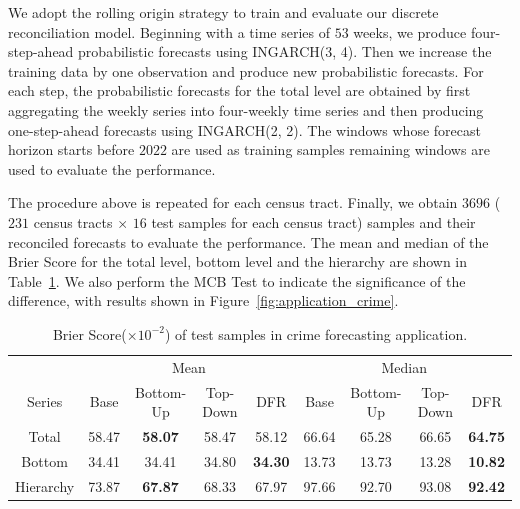 \documentclass[a4paper,review,12pt,authoryear]{elsarticle}
\begin{document}
     We adopt the rolling origin strategy to train and evaluate our discrete reconciliation model. 
     Beginning with a time series of $53$ weeks, we produce four-step-ahead probabilistic forecasts using INGARCH(3, 4). 
     Then we increase the training data by one observation and produce new probabilistic forecasts. 
     For each step, the probabilistic forecasts for the total level are obtained by first aggregating the weekly series into four-weekly time series and then producing one-step-ahead forecasts using INGARCH(2, 2).
     The windows whose forecast horizon starts before $2022$ are used as training samples remaining windows are used to evaluate the performance.
     
     The procedure above is repeated for each census tract. 
     Finally, we obtain $3696$ ($231$ census tracts $\times$ $16$ test samples for each census tract) samples and their reconciled forecasts to evaluate the performance. 
     The mean and median of the Brier Score for the total level, bottom level and the hierarchy are shown in Table~\ref{tab:crime_bs}. 
     We also perform the MCB Test to indicate the significance of the difference, with results shown in Figure~\ref{fig:application_crime}.
     
     
     \begin{table}[h]
       \centering
       \caption{\label{tab:crime_bs} Brier Score($\times 10^{-2}$) of test samples in crime forecasting application.}
       \begin{tabular}{ccccccccc}
       \toprule
       &\multicolumn{4}{c}{Mean} 
       & \multicolumn{4}{c}{Median} \\ \cmidrule(lr){2-5} \cmidrule(lr){6-9}
       Series & Base & Bottom-Up & Top-Down & DFR &  Base & Bottom-Up & Top-Down & DFR \\\midrule
       Total & 58.47 & \textbf{58.07} & 58.47 & 58.12 & 66.64 & 65.28 & 66.65 & \textbf{64.75} \\
       Bottom & 34.41 & 34.41 & 34.80 & \textbf{34.30} & 13.73 & 13.73 & 13.28 & \textbf{10.82}\\
       Hierarchy & 73.87 & \textbf{67.87} & 68.33 & 67.97 & 97.66 & 92.70 & 93.08 & \textbf{92.42}\\
       \bottomrule
       \end{tabular}
       \end{table}
     
\end{document}
